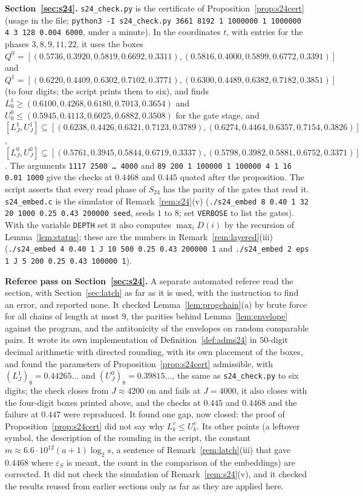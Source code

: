 \documentclass[11pt]{amsart}
\theoremstyle{definition}
\theoremstyle{remark}
\newcommand{\eps}{\varepsilon}
\begin{document}
\medskip\noindent\textbf{Section~\ref{sec:s24}.} \texttt{s24\_check.py} is the certificate of
Proposition~\ref{prop:s24cert} (usage in the file; \texttt{python3 -I s24\_check.py 3661 8192 1
1000000 1 1000000 4 3 128 0.004 6000}, under a minute). In the coordinates $t$, with entries for
the phases $3,8,9,11,22$, it uses the boxes
$Q^0=[(0.5736,0.3920,0.5819,0.6692,0.3311),(0.5816,0.4000,0.5899,0.6772,0.3391)]$ and
$Q^1=[(0.6220,0.4409,0.6302,0.7102,0.3771),(0.6300,0.4489,0.6382,0.7182,0.3851)]$ (to four
digits; the script prints them to six), and finds
$L^1_0\ge(0.6100,0.4268,0.6180,0.7013,0.3654)$ and $U^0_0\le(0.5945,0.4113,0.6025,0.6882,0.3508)$
for the gate stage, and
$[L^1_J,U^1_J]\subseteq[(0.6238,0.4426,0.6321,0.7123,0.3789),(0.6274,0.4464,0.6357,0.7154,0.3826)]$,
$[L^0_J,U^0_J]\subseteq[(0.5761,0.3945,0.5844,0.6719,0.3337),(0.5798,0.3982,0.5881,0.6752,0.3371)]$.
The arguments \texttt{1117 2500 \dots\ 4000} and \texttt{89 200 1 100000 1 100000 4 1 16 0.01 1000}
give the checks at $0.4468$ and $0.445$ quoted after the proposition. The script asserts that every
read phase of $S_{24}$ has the parity of the gates that read it. \texttt{s24\_embed.c} is the
simulator of Remark~\ref{rem:s24}(v) (\texttt{./s24\_embed 8 0.40 1 32 20 1000 0.25 0.43 200000
seed}, seeds $1$ to $8$; set \texttt{VERBOSE} to list the gates). With the variable
\texttt{DEPTH} set it also computes $\max_iD(i)$ by the recursion of Lemma~\ref{lem:status}; these
are the numbers in Remark~\ref{rem:layered}(iii) (\texttt{./s24\_embed 4 0.40 1 J 10 500 0.25 0.43
200000 1} and \texttt{./s24\_embed 2 eps 1 J 5 200 0.25 0.43 100000 1}).

\medskip\noindent\textbf{Referee pass on Section~\ref{sec:s24}.} A separate automated referee read
the section, with Section~\ref{sec:latch} as far as it is used, with the instruction to find an
error, and reported none. It checked Lemma~\ref{lem:progchain}(a) by brute force for all chains of
length at most $9$, the parities behind Lemma~\ref{lem:envelope} against the program, and the
antitonicity of the envelopes on random comparable pairs. It wrote its own implementation of
Definition~\ref{def:adms24} in $50$-digit decimal arithmetic with directed rounding, with its own
placement of the boxes, and found the parameters of Proposition~\ref{prop:s24cert} admissible,
with $(L^1_J)_8=0.44265\ldots$ and $(U^0_J)_8=0.39815\ldots$, the same as \texttt{s24\_check.py} to
six digits; the check closes from $J\approx4200$ on and fails at $J=4000$, it also closes with the
four-digit boxes printed above, and the checks at $0.445$ and $0.4468$ and the failure at $0.447$
were reproduced. It found one gap, now closed: the proof of Proposition~\ref{prop:s24cert} did not
say why $L^v_k\le U^v_k$. Its other points (a leftover symbol, the description of the rounding in
the script, the constant $m\approx6.6\cdot10^{12}(a+1)\log_2s$, a sentence of
Remark~\ref{rem:latch}(iii) that gave $0.4468$ where $\eps_S$ is meant, the count in the comparison
of the embeddings) are corrected. It did not check the simulation of Remark~\ref{rem:s24}(v), and it
checked the results reused from earlier sections only as far as they are applied here.
\end{document}
